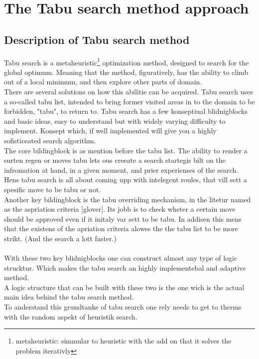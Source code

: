 \section{The Tabu search method approach}
\subsection{Description of Tabu search method}
Tabu search is a metaheuristic\footnote{ metaheuristic: simmular to heuristic with the add on that it solves the problem iterativly} optimization method, designed to search for the global optimum. Meaning that the method, figuratively, has the ability to climb out of a local minimum, and then explore other parts of domain.\\
There are several solutions on how this abilitie can be acquired. Tabu search uses a so-called tabu list, intended to bring former visited areas in to the domain to be forbidden, "tabu", to return to.
Tabu search has a few konseptiual blidnigblocks and basic ideas, easy to understand but with widely varying difficulty to implement. Konsept which, if well implemented will give you a highly sofisticeated search algorithm.\\
The core bildingblock is as mention before the tabu list. The ability to render a surten regen or moves tabu lets ous creeate a search startegis bilt on the infromation at hand, in a given moment, and prier experienses of the search. Hens tabu search is all about coming upp with intelegent roules, that vill sett a spesific move to be tabu or not.\\ 
Another key bildingblock is the tabu overriding mechanism, in the litetur named as the aspriation criteria [glover]. Its jobb is to check wheter a certain move should be approved even if it initaly var sett to be tabu. In addisen this mens that the existens of the apriation criteria alowes the the tabu list to be more strikt. (And the search a lott faster.)\\
\\
With these two key blidnigblocks one can construct almost any type of logic strucktur. Which makes the tabu search an highly implementebal and adaptive method.\\
A logic structure that can be built with these two is the one wich is the actual main idea behind the tabu search method.\\
To anderstand this grundtanke of tabu search one rely needs to get to therms with the random aspekt of heuristik search.\\ 
